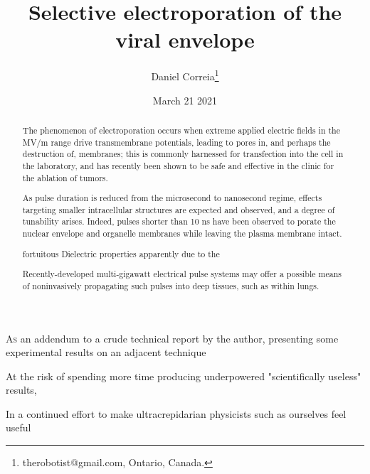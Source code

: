 \documentclass[fleqn,10pt]{paper}
\begin{document}
\title{Selective electroporation of the viral envelope}
\author{\footnotesize{Daniel Correia}\footnote{therobotist@gmail.com, Ontario, Canada.}}
\date{\small{March 21 2021}}

\flushbottom 
\maketitle



\thispagestyle{empty}

\renewcommand{\abstractname}{Summary}    %

\begin{abstract}
	\noindent The phenomenon of electroporation occurs when extreme applied electric fields in the MV/m range drive transmembrane potentials, leading to pores in, and perhaps the destruction of, membranes; this is commonly harnessed for transfection into the cell in the laboratory, and has recently been shown to be safe and effective in the clinic for the ablation of tumors.
	
	\noindent As pulse duration is reduced from the microsecond to nanosecond regime, effects targeting smaller intracellular structures are expected and observed, and a degree of tunability arises. Indeed, pulses shorter than 10 ns have been observed to porate the nuclear envelope and organelle membranes while leaving the plasma membrane intact.
	
	fortuitous Dielectric properties apparently due to the 
	
	\noindent Recently-developed multi-gigawatt electrical pulse systems may offer a possible means of noninvasively propagating such pulses into deep tissues, such as within lungs. 
\end{abstract}


\lettrine{A}{s} an addendum to a crude technical report \cite{notes2021} by the author, presenting some experimental results on an adjacent technique

At the risk of spending more time producing underpowered "scientifically useless" results, 

In a continued effort to make ultracrepidarian physicists such as ourselves feel useful 
\end{document}
